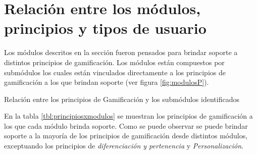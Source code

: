 
\section{Relación entre los módulos, principios y tipos de usuario}
\label{analisis:principios}

 Los módulos descritos en la sección  fueron pensados para
 brindar soporte a distintos principios de gamificación. Los módulos están compuestos
 por submódulos los cuales están vinculados directamente a los principios de
 gamificación a los que brindan soporte (ver figura \ref{fig:modulosP}).

    {Relación entre los principios de Gamificación y los submódulos identificados}

 \clearpage
 \noindent
 En la tabla \ref{tbl:principiosxmodulos} se muestran los principios de gamificación
 a los que cada módulo brinda soporte. Como se puede observar se puede brindar
 soporte a la mayoría de los principios de gamificación desde distintos módulos,
 exceptuando los principios de {\it diferenciación y pertenencia} y
 {\it Personalización}.


